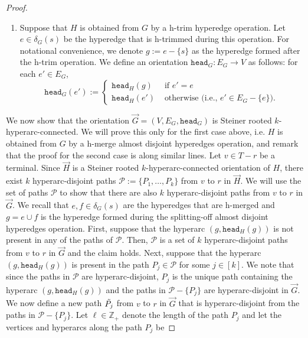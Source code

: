 \documentclass{article}
\newcommand{\knote}[1]{{\color{red}[{\tiny Karthik: \bf #1}]\marginpar{\color{red}*}}}
\newcommand{\head}{\ensuremath{\texttt{head}}\xspace}
\providecommand{\Z}{\mathbb{Z}}
\providecommand{\calP}{\mathcal{P}}
\begin{document}
\begin{proof}
\begin{enumerate}
    \item Suppose that $H$ is obtained from $G$ 
    by a h-trim hyperedge operation. Let $e \in \delta_{G}(s)$ be the hyperedge that is h-trimmed during this operation. For notational convenience, we denote $g:= e - \{s\}$ as the hyperedge formed after the h-trim operation. We define an orientation $\head_{G}:E_G\rightarrow V$ as follows: for each $e' \in E_G$,
$$\head_{G}(e') := \begin{cases}
    \head_{H}(g)& \text{ if } e' = e\\
    \head_{H}(e')& \text{ otherwise (i.e., $e'\in E_G-\{e\}$).}
\end{cases}$$  
\end{enumerate}
        We now show that the orientation $\overrightarrow{G} = (V, E_G, \head_G)$ is Steiner rooted $k$-hyperarc-connected. We will prove this only for the first case above, i.e. $H$ is obtained from $G$ by a h-merge almost disjoint hyperedges operation, and remark that the proof for the second case is along similar lines. Let $v \in T - r$ be a terminal. Since $\overrightarrow{H}$ is a Steiner rooted $k$-hyperarc-connected orientation of $H$, there exist $k$ hyperarc-disjoint paths $\calP := \{P_1, \ldots, P_k\}$ 
        from $v$ to $r$ 
        in $\overrightarrow{H}$. We will use the set of paths $\calP$ to show that there are also $k$ hyperarc-disjoint paths 
        from $v$ to $r$ 
        in $\overrightarrow{G}$. We recall that $e, f \in \delta_G(s)$ are the hyperedges that are h-merged and $g = e \cup f $ is the hyperedge formed during the splitting-off almost disjoint hyperedges operation. First, suppose that the hyperarc $(g, \head_H(g))$ is not present in any of the paths of $\calP$. Then, $\calP$ is a set of $k$ hyperarc-disjoint paths 
        from $v$ to $r$ 
        in $\overrightarrow{G}$ and the claim holds. Next, suppose that the hyperarc $(g, \head_H(g))$ is present in the path $P_j \in \calP$ for some $j \in [k]$. We note that since the paths in $\calP$ are hyperarc-disjoint, $P_j$ is the unique path containing the hyperarc $(g, \head_H(g))$ and the paths in $\calP - \{P_j\}$ are hyperarc-disjoint in $\overrightarrow{G}$. We now define a new path $\Tilde{P_j}$ 
        from $v$ to $r$ 
        in $\overrightarrow{G}$ that is hyperarc-disjoint from the paths in $\calP - \{P_j\}$. Let $\ell \in \Z_+$ denote the length of the path $P_j$ and let the vertices and hyperarcs along the path $P_j$ be 

\end{proof}
\end{document}
